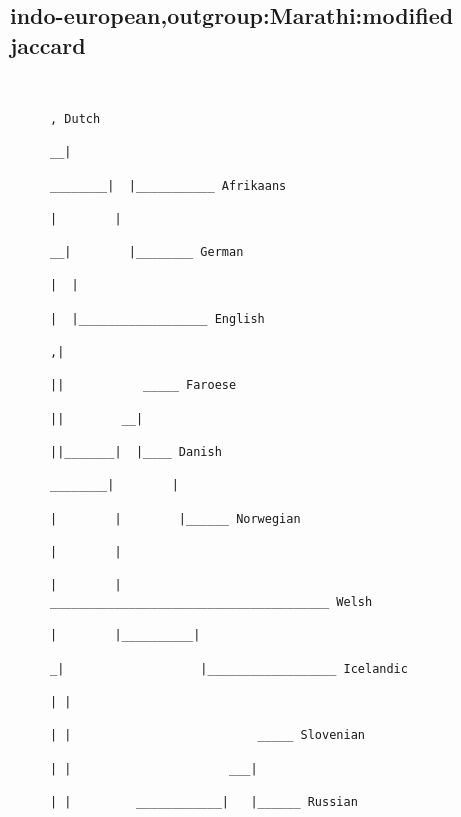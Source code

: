 \subsection{indo-european,outgroup:Marathi:modified jaccard}
\begin{figure}[H]
\begin{center}
{
\selectfont
\begin{verbatim}

                                                                                                     , Dutch
                                                                                                   __|
                                                                                          ________|  |___________ Afrikaans
                                                                                         |        |
                                                                                       __|        |________ German
                                                                                      |  |
                                                                                      |  |__________________ English
                                                                                     ,|
                                                                                     ||           _____ Faroese
                                                                                     ||        __|
                                                                                     ||_______|  |____ Danish
                                                                             ________|        |
                                                                            |        |        |______ Norwegian
                                                                            |        |
                                                                            |        |           _______________________________________ Welsh
                                                                            |        |__________|
                                                                           _|                   |__________________ Icelandic
                                                                          | |
                                                                          | |                          _____ Slovenian
                                                                          | |                      ___|
                                                                          | |         ____________|   |______ Russian

\end{verbatim}}
\end{center}
\end{figure}
